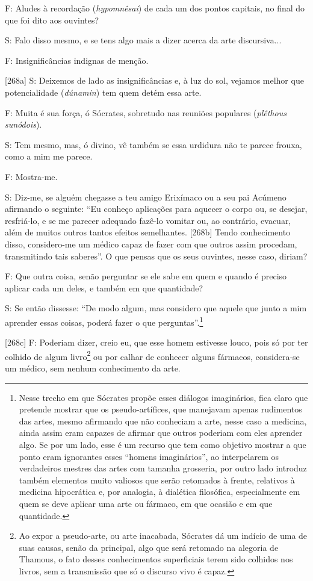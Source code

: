 F: Aludes à recordação (\emph{hypomnêsai}) de cada um dos pontos
capitais, no final do que foi dito aos ouvintes?

S: Falo disso mesmo, e se tens algo mais a dizer acerca da arte
discursiva...

F: Insignificâncias indignas de menção.

{[}268a{]} S: Deixemos de lado as insignificâncias e, à luz do sol,
vejamos melhor que potencialidade (\emph{dúnamin}) tem quem detém essa
arte.

F: Muita é sua força, ó Sócrates, sobretudo nas reuniões populares
(\emph{plḗthous} \emph{sunódois}).

S: Tem mesmo, mas, ó divino, vê também se essa urdidura não te parece
frouxa, como a mim me parece.

F: Mostra-me.

S: Diz-me, se alguém chegasse a teu amigo Erixímaco ou a seu pai Acúmeno
afirmando o seguinte: ``Eu conheço aplicações para aquecer o corpo ou,
se desejar, resfriá-lo, e se me parecer adequado fazê-lo vomitar ou, ao
contrário, evacuar, além de muitos outros tantos efeitos semelhantes.
{[}268b{]} Tendo conhecimento disso, considero-me um médico capaz de
fazer com que outros assim procedam, transmitindo tais saberes''. O que
pensas que os seus ouvintes, nesse caso, diriam?

F: Que outra coisa, senão perguntar se ele sabe em quem e quando é
preciso aplicar cada um deles, e também em que quantidade?

S: Se então dissesse: ``De modo algum, mas considero que aquele que
junto a mim aprender essas coisas, poderá fazer o que
perguntas''.\footnote{Nesse trecho em que Sócrates propõe esses diálogos
  imaginários, fica claro que pretende mostrar que os pseudo-artífices,
  que manejavam apenas rudimentos das artes, mesmo afirmando que não
  conheciam a arte, nesse caso a medicina, ainda assim eram capazes de
  afirmar que outros poderiam com eles aprender algo. Se por um lado,
  esse é um recurso que tem como objetivo mostrar a que ponto eram
  ignorantes esses ``homens imaginários'', ao interpelarem os
  verdadeiros mestres das artes com tamanha grosseria, por outro lado
  introduz também elementos muito valiosos que serão retomados à frente,
  relativos à medicina hipocrática e, por analogia, à dialética
  filosófica, especialmente em quem se deve aplicar uma arte ou fármaco,
  em que ocasião e em que quantidade.}

{[}268c{]} F: Poderiam dizer, creio eu, que esse homem estivesse louco,
pois só por ter colhido de algum livro\footnote{Ao expor a pseudo-arte,
  ou arte inacabada, Sócrates dá um indício de uma de suas causas, senão
  da principal, algo que será retomado na alegoria de Thamous, o fato
  desses conhecimentos superficiais terem sido colhidos nos livros, sem
  a transmissão que só o discurso vivo é capaz.} ou por calhar de
conhecer alguns fármacos, considera-se um médico, sem nenhum
conhecimento da arte.

